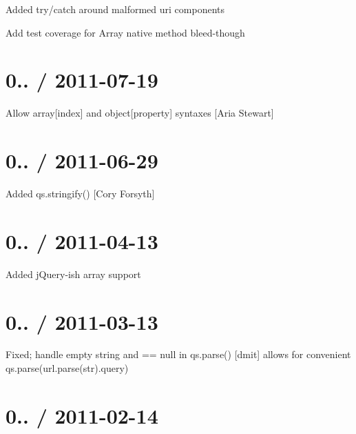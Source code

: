 \begin{DoxyItemize}
\item Added {\ttfamily try/catch} around malformed uri components
\item Add test coverage for Array native method bleed-\/though
\end{DoxyItemize}

\section*{0.. / 2011-\/07-\/19 }


\begin{DoxyItemize}
\item Allow {\ttfamily array\mbox{[}index\mbox{]}} and {\ttfamily object\mbox{[}property\mbox{]}} syntaxes \mbox{[}Aria Stewart\mbox{]}
\end{DoxyItemize}

\section*{0.. / 2011-\/06-\/29 }


\begin{DoxyItemize}
\item Added {\ttfamily qs.\+stringify()} \mbox{[}Cory Forsyth\mbox{]}
\end{DoxyItemize}

\section*{0.. / 2011-\/04-\/13 }


\begin{DoxyItemize}
\item Added j\+Query-\/ish array support
\end{DoxyItemize}

\section*{0.. / 2011-\/03-\/13 }


\begin{DoxyItemize}
\item Fixed; handle empty string and {\ttfamily == null} in {\ttfamily qs.\+parse()} \mbox{[}dmit\mbox{]} allows for convenient {\ttfamily qs.\+parse(url.\+parse(str).query)}
\end{DoxyItemize}

\section*{0.. / 2011-\/02-\/14 }


